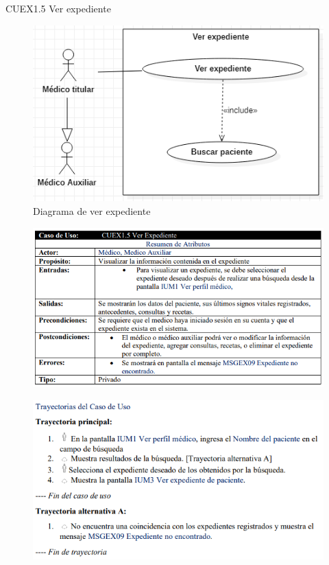 \documentclass[12pt,letterpaper]{article}
\begin{document}
            \newpage
            CUEX1.5 Ver expediente
            \begin{figure}[H]
                \centering
                \includegraphics [scale=0.7]{casosUso/verExpediente}
                \caption{Diagrama de ver expediente}
            \end{figure}
            \begin{figure}[H]
                \centering
                \includegraphics [scale=0.8]{specs/specVerExpediente}
            \end{figure}
            \begin{figure}[H]
                \centering
                \includegraphics [scale=0.9]{specs/trayVerExpediente}
            \end{figure}
\end{document}
